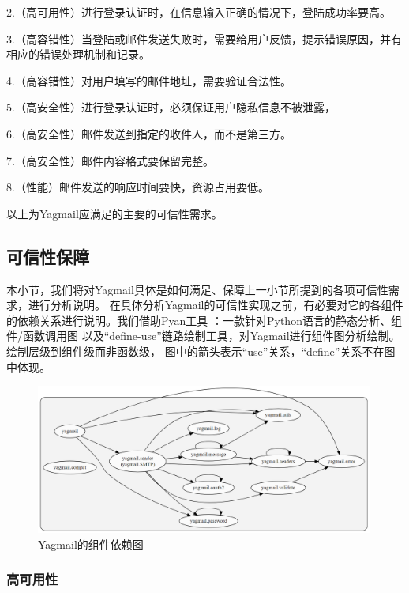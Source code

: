 \documentclass[UTF8,12pt,a4paper]{ctexart}
\begin{document}
    2.（高可用性）进行登录认证时，在信息输入正确的情况下，登陆成功率要高。
    
    3.（高容错性）当登陆或邮件发送失败时，需要给用户反馈，提示错误原因，并有相应的错误处理机制和记录。
    
    4.（高容错性）对用户填写的邮件地址，需要验证合法性。
    
    5.（高安全性）进行登录认证时，必须保证用户隐私信息不被泄露，
    
    6.（高安全性）邮件发送到指定的收件人，而不是第三方。
    
    7.（高安全性）邮件内容格式要保留完整。
    
    8.（性能）邮件发送的响应时间要快，资源占用要低。
    
    以上为Yagmail应满足的主要的可信性需求。

\subsection{可信性保障}

    本小节，我们将对Yagmail具体是如何满足、保障上一小节所提到的各项可信性需求，进行分析说明。
    在具体分析Yagmail的可信性实现之前，有必要对它的各组件的依赖关系进行说明。我们借助Pyan工具
    \cite{pyan}：一款针对Python语言的静态分析、组件/函数调用图
    以及“define-use”链路绘制工具，对Yagmail进行组件图分析绘制。绘制层级到组件级而非函数级，
    图中的箭头表示“use”关系，“define”关系不在图中体现。
    
    \begin{figure}[H]
        \centering
        \includegraphics[width=0.99\textwidth]{figure/component-dep-graph.png}
        \caption{Yagmail的组件依赖图}
        \label{fig:component-dep-graph}
    \end{figure}
    
    \subsubsection{高可用性}
    
\end{document}
